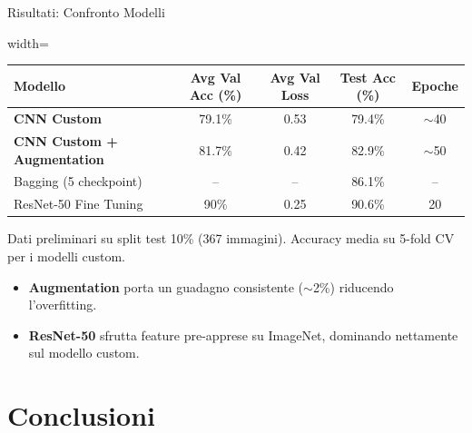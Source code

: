 \documentclass[9pt,serif,usenames,dvipsnames]{beamer}
\begin{document}
\begin{frame}{\centering Risultati: Confronto Modelli}

    \begin{adjustbox}{width=\textwidth}
        \small
        \renewcommand{\arraystretch}{1.25}
        \begin{tabular}{lcccc}
            \toprule
            \textbf{Modello} & \textbf{Avg Val Acc (\%)} & \textbf{Avg Val Loss}
            & \textbf{Test Acc (\%)} & \textbf{Epoche}\\
            \midrule
            \textbf{CNN Custom}        & 79.1\% & 0.53 & 79.4\% & $\sim$40 \\
            \textbf{CNN Custom + Augmentation}        & 81.7\% & 0.42 & 82.9\% & $\sim$50 \\
            Bagging (5 checkpoint)   & -- & -- & 86.1\% & -- \\
            ResNet-50 Fine Tuning & 90\% & 0.25 & 90.6\% & 20 \\
            \bottomrule
        \end{tabular}
    \end{adjustbox}

    \vspace{0.2cm}

    \begin{flushleft}
        \tiny Dati preliminari su split test 10\% (367 immagini).
        Accuracy media su 5-fold CV per i modelli custom.
    \end{flushleft}

    \begin{itemize}
        \item<1-> \textbf{Augmentation} porta un guadagno consistente
        ($\sim$2\%) riducendo l'overfitting.
        \item<2-> \textbf{ResNet-50} sfrutta feature pre-apprese su
        ImageNet, dominando nettamente sul modello custom.
    \end{itemize}
\end{frame}
\section{Conclusioni}
\end{document}

